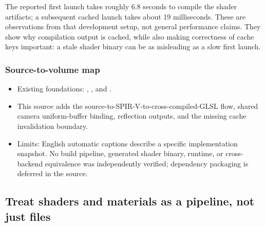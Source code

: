 The reported first launch takes roughly 6.8 seconds to compile the shader artifacts; a subsequent cached launch takes about 19 milliseconds. These are observations from that development setup, not general performance claims. They show why compilation output is cached, while also making correctness of cache keys important: a stale shader binary can be as misleading as a slow first launch.

\subsubsection{Source-to-volume map}\label{06-engine-ii-ch026-source-to-volume-map}

\hypertarget{06-engine-ii-ch026-source-to-volume-map}{}

\begin{itemize}
\tightlist
\item
  Existing foundations: , , and .
\item
  This source adds the source-to-SPIR-V-to-cross-compiled-GLSL flow, shared camera uniform-buffer binding, reflection outputs, and the missing cache invalidation boundary.
\item
  Limits: English automatic captions describe a specific implementation snapshot. No build pipeline, generated shader binary, runtime, or cross-backend equivalence was independently verified; dependency packaging is deferred in the source.
\end{itemize}

\subsection{Treat shaders and materials as a pipeline, not just files}\label{06-engine-ii-ch026-treat-shaders-and-materials-as-a-pipeline-not-just-files}

